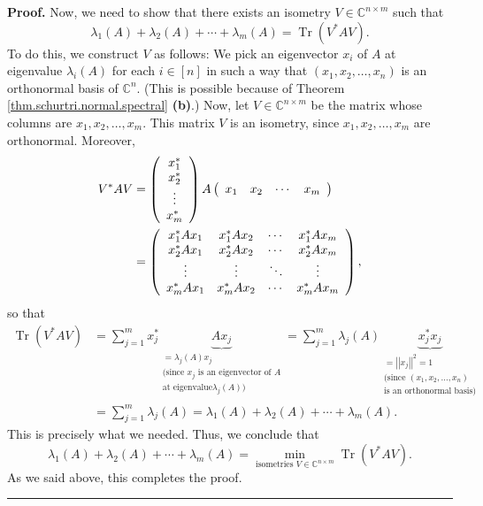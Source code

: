 \documentclass[numbers=enddot,12pt,final,onecolumn,notitlepage]{scrartcl}%
\numberwithin{exer}{subsection}
\theoremstyle{definition}
\newenvironment{proof}[1][Proof]{\noindent\textbf{#1.} }{\ \rule{0.5em}{0.5em}}
\let\sumnonlimits\sum
\renewcommand{\sum}{\sumnonlimits\limits}
\begin{document}
\begin{proof}
Now, we need to show that there exists an isometry $V\in\mathbb{C}^{n\times
m}$ such that%
\[
\lambda_{1}\left(  A\right)  +\lambda_{2}\left(  A\right)  +\cdots+\lambda
_{m}\left(  A\right)  =\operatorname*{Tr}\left(  V^{\ast}AV\right)  .
\]
To do this, we construct $V$ as follows: We pick an eigenvector $x_{i}$ of $A$
at eigenvalue $\lambda_{i}\left(  A\right)  $ for each $i\in\left[  n\right]
$ in such a way that $\left(  x_{1},x_{2},\ldots,x_{n}\right)  $ is an
orthonormal basis of $\mathbb{C}^{n}$. (This is possible because of Theorem
\ref{thm.schurtri.normal.spectral} \textbf{(b)}.) Now, let $V\in
\mathbb{C}^{n\times m}$ be the matrix whose columns are $x_{1},x_{2}%
,\ldots,x_{m}$. This matrix $V$ is an isometry, since $x_{1},x_{2}%
,\ldots,x_{m}$ are orthonormal. Moreover,%
\begin{align*}
V^{\ast}AV &  =\left(
\begin{array}
[c]{c}%
x_{1}^{\ast}\\
x_{2}^{\ast}\\
\vdots\\
x_{m}^{\ast}%
\end{array}
\right)  A\left(
\begin{array}
[c]{cccc}%
x_{1} & x_{2} & \cdots & x_{m}%
\end{array}
\right)  \\
&  =\left(
\begin{array}
[c]{cccc}%
x_{1}^{\ast}Ax_{1} & x_{1}^{\ast}Ax_{2} & \cdots & x_{1}^{\ast}Ax_{m}\\
x_{2}^{\ast}Ax_{1} & x_{2}^{\ast}Ax_{2} & \cdots & x_{2}^{\ast}Ax_{m}\\
\vdots & \vdots & \ddots & \vdots\\
x_{m}^{\ast}Ax_{1} & x_{m}^{\ast}Ax_{2} & \cdots & x_{m}^{\ast}Ax_{m}%
\end{array}
\right)  ,
\end{align*}
so that%
\begin{align*}
\operatorname*{Tr}\left(  V^{\ast}AV\right)   &  =\sum_{j=1}^{m}x_{j}^{\ast
}\underbrace{Ax_{j}}_{\substack{=\lambda_{j}\left(  A\right)  x_{j}%
\\\text{(since }x_{j}\text{ is an eigenvector of }A\\\text{at eigenvalue
}\lambda_{j}\left(  A\right)  \text{)}}}=\sum_{j=1}^{m}\lambda_{j}\left(
A\right)  \underbrace{x_{j}^{\ast}x_{j}}_{\substack{=\left\vert \left\vert
x_{j}\right\vert \right\vert ^{2}=1\\\text{(since }\left(  x_{1},x_{2}%
,\ldots,x_{n}\right)  \\\text{is an orthonormal basis)}}}\\
&  =\sum_{j=1}^{m}\lambda_{j}\left(  A\right)  =\lambda_{1}\left(  A\right)
+\lambda_{2}\left(  A\right)  +\cdots+\lambda_{m}\left(  A\right)  .
\end{align*}
This is precisely what we needed. Thus, we conclude that%
\[
\lambda_{1}\left(  A\right)  +\lambda_{2}\left(  A\right)  +\cdots+\lambda
_{m}\left(  A\right)  =\min\limits_{\text{isometries }V\in\mathbb{C}^{n\times
m}}\operatorname*{Tr}\left(  V^{\ast}AV\right)  .
\]
As we said above, this completes the proof.
\end{proof}
\end{document}
